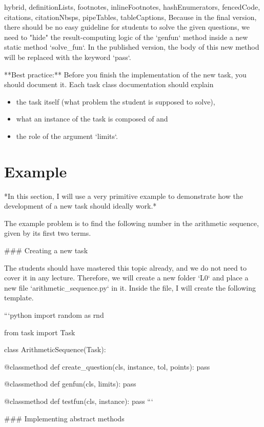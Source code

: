 \documentclass[
  digital, %
  table,   %
  twoside, %
  nolof,     %
  nolot,     %
  draft=false,
  final,
]{fithesis3}
\begin{document}
\begin{markdown*}{%
  hybrid,
  definitionLists,
  footnotes,
  inlineFootnotes,
  hashEnumerators,
  fencedCode,
  citations,
  citationNbsps,
  pipeTables,
  tableCaptions,
}
Because in the final version, there should be no easy guideline
for students to solve the given questions, we need to "hide" the
result-computing logic of the `genfun` method inside a new static method 
`solve_fun`. In the published version, the body of this new method will be 
replaced with the keyword `pass`.

\begin{shaded}{**Best practice:**}
Before you finish the implementation of the new task, you should document it. Each task class documentation should explain
\begin{itemize}
    \item the task itself (what problem the student is supposed to solve),
    \item what an instance of the task is composed of and 
    \item the role of the argument `limits`.
\end{itemize}
\end{shaded}

\section{Example}
\label{sec:example}

*In this section, I will use a very primitive example to demonstrate how the 
development of a new task should ideally work.*

The example problem is to find the following number in the arithmetic sequence, 
given by its first two terms.

### Creating a new task

The students should have mastered this topic already, and we do not need to cover 
it in any lecture. Therefore, we will create a new folder `L0` and place a new
file `arithmetic_sequence.py` in it. Inside the file, I will create the following template.

```python
import random as rnd

from task import Task

class ArithmeticSequence(Task):

    @classmethod
    def create_question(cls, instance, tol, points):
        pass
    
    @classmethod
    def genfun(cls, limits):
        pass
    
    @classmethod
    def testfun(cls, instance):
        pass
```

### Implementing abstract methods


\end{markdown*}
\end{document}
